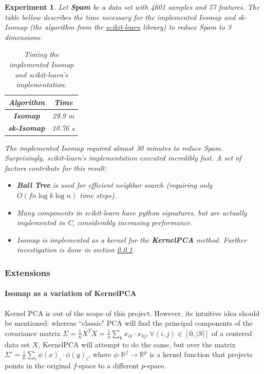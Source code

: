 \documentclass[12pt]{article}
\newtheorem{experiment}{Experiment}[section]
\begin{document}
\begin{experiment}
	Let \textbf{Spam} be a data set with 4601 samples and 57 features. The table bellow describes the time necessary for the implemented Isomap and sk-Isomap (the algorithm from the \href{http://scikit-learn.org}{scikit-learn} library) to reduce Spam to 3 dimensions:
	
	\begin{table}[H]
		\centering
		\begin{tabular}{|c|c|}
			\hline
			\textbf{Algorithm} & Time \\\hline
			\textbf{Isomap} & 29.9 m \\\hline
			\textbf{sk-Isomap} & 10.76 s \\\hline
		\end{tabular}
		
		\caption{Timing the implemented Isomap and scikit-learn's implementation.}
	\end{table}

	The implemented Isomap required almost 30 minutes to reduce Spam.
	Surprisingly, scikit-learn's implementation executed incredibly fast. A set of factors contribute for this result:

	\begin{itemize}
		\item \textbf{Ball Tree} is used for efficient neighbor search (requiring only $O(f n \log k \log n)$ time steps).
		\item Many components in scikit-learn have python signatures, but are actually implemented in C, considerably increasing performance.
		\item Isomap is implemented as a kernel for the \textbf{KernelPCA} method. Further investigation is done in section \ref{sec:isomap_extensions}.
	\end{itemize}
	
\end{experiment}

\subsubsection{Extensions}
\label{sec:isomap_extensions}

\paragraph{Isomap as a variation of KernelPCA}

Kernel PCA is out of the scope of this project. However, its intuitive idea should be mentioned: whereas ``classic" PCA will find the principal components of the covariance matrix $\Sigma = \frac{1}{n} X^T X = \frac{1}{n} \sum_k x_{ik} \cdot x_{kj}, \forall (i, j) \in [0, |S|]$ of a centered data set $X$, KernelPCA will attempt to do the same, but over the matrix $\Sigma' = \frac{1}{n} \sum_i \phi(x)_i \cdot \phi(y)_i$, where $\phi \colon \mathbb{R}^f \to \mathbb{R}^p$ is a kernel function that projects points in the original $f$-space to a different $p$-space.
\end{document}
